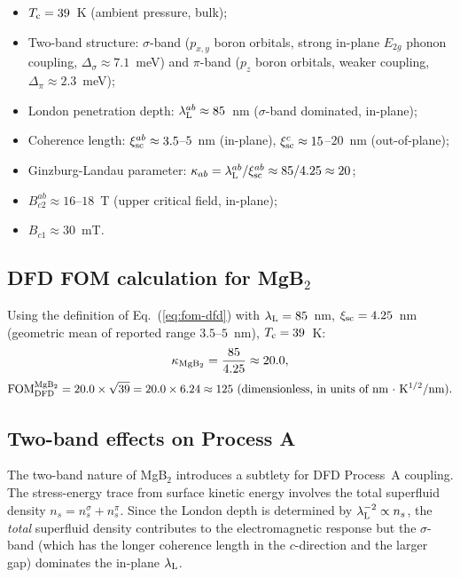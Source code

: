 \documentclass[11pt]{article}
\newcommand{\lambdaL}{\lambda_{\rm L}}
\newcommand{\xsc}{\xi_{\rm sc}}
\newcommand{\Tc}{T_{\rm c}}
\newcommand{\FOM}{\mathrm{FOM}}
\begin{document}
\begin{itemize}
\item $\Tc = 39$~K (ambient pressure, bulk);
\item Two-band structure: $\sigma$-band ($p_{x,y}$ boron orbitals, strong
  in-plane $E_{2g}$ phonon coupling, $\Delta_\sigma \approx 7.1$~meV) and
  $\pi$-band ($p_z$ boron orbitals, weaker coupling, $\Delta_\pi \approx 2.3$~meV);
\item London penetration depth: $\lambdaL^{ab} \approx 85$~nm ($\sigma$-band
  dominated, in-plane);
\item Coherence length: $\xsc^{ab} \approx 3.5$--$5$~nm (in-plane),
  $\xsc^{c} \approx 15$--$20$~nm (out-of-plane);
\item Ginzburg-Landau parameter: $\kappa_{ab} = \lambdaL^{ab}/\xsc^{ab}
  \approx 85/4.25 \approx 20$;
\item $B_{c2}^{ab} \approx 16$--$18$~T (upper critical field, in-plane);
\item $B_{c1} \approx 30$~mT.
\end{itemize}

\subsection{DFD FOM calculation for MgB$_2$}

Using the definition of Eq.~(\ref{eq:fom-dfd}) with $\lambdaL = 85$~nm,
$\xsc = 4.25$~nm (geometric mean of reported range $3.5$--$5$~nm),
$\Tc = 39$~K:
\begin{equation}
\kappa_{\rm MgB_2} = \frac{85}{4.25} \approx 20.0,
\end{equation}
\begin{equation}
\FOM_{\rm DFD}^{\rm MgB_2}
= 20.0 \times \sqrt{39}
= 20.0 \times 6.24
\approx 125~\text{(dimensionless, in units of nm $\cdot$ K$^{1/2}$/nm)}.
\label{eq:fom-mgb2}
\end{equation}

\subsection{Two-band effects on Process A}

The two-band nature of MgB$_2$ introduces a subtlety for DFD Process~A
coupling. The stress-energy trace from surface kinetic energy involves the
total superfluid density $n_s = n_s^\sigma + n_s^\pi$. Since the London depth
is determined by $\lambdaL^{-2} \propto n_s$, the \emph{total} superfluid
density contributes to the electromagnetic response but the $\sigma$-band
(which has the longer coherence length in the $c$-direction and the larger gap)
dominates the in-plane $\lambdaL$.
\end{document}
